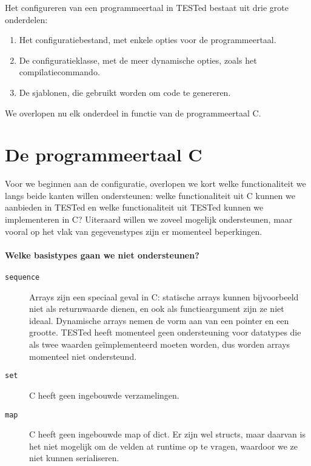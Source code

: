 Het configureren van een programmeertaal in TESTed bestaat uit drie grote onderdelen:

\begin{enumerate}
    \item Het configuratiebestand, met enkele opties voor de programmeertaal.
    \item De configuratieklasse, met de meer dynamische opties, zoals het compilatiecommando.
    \item De sjablonen, die gebruikt worden om code te genereren.
\end{enumerate}

We overlopen nu elk onderdeel in functie van de programmeertaal C\@.

\section{De programmeertaal C}\label{sec:de-programmeertaal-c}

Voor we beginnen aan de configuratie, overlopen we kort welke functionaliteit we langs beide kanten willen ondersteunen: welke functionaliteit uit C kunnen we aanbieden in TESTed en welke functionaliteit uit TESTed kunnen we implementeren in C?
Uiteraard willen we zoveel mogelijk ondersteunen, maar vooral op het vlak van gegevenstypes zijn er momenteel beperkingen.

\paragraph{Welke basistypes gaan we niet ondersteunen?}

\begin{description}
    \item[\texttt{sequence}] Arrays zijn een speciaal geval in C: statische arrays kunnen bijvoorbeeld niet als returnwaarde dienen, en ook als functieargument zijn ze niet ideaal.
    Dynamische arrays nemen de vorm aan van een pointer en een grootte. 
    TESTed heeft momenteel geen ondersteuning voor datatypes die als twee waarden geïmplementeerd moeten worden, dus worden arrays momenteel niet ondersteund.
    \item[\texttt{set}] C heeft geen ingebouwde verzamelingen.
    \item[\texttt{map}] C heeft geen ingebouwde map of dict.
    Er zijn wel structs, maar daarvan is het niet mogelijk om de velden at runtime op te vragen, waardoor we ze niet kunnen serialiseren.
\end{description}

